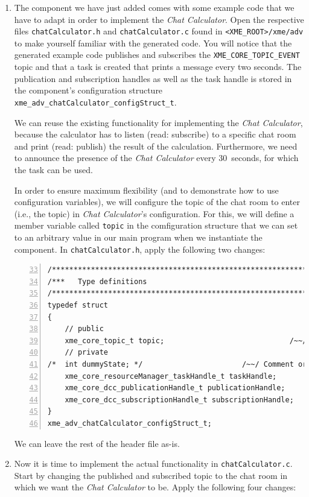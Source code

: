 \begin{enumerate}
	\item The component we have just added comes with some example code that we have to adapt in order to implement the \emph{Chat Calculator}.
		Open the respective files \verb|chatCalculator.h| and \verb|chatCalculator.c| found in \verb|<XME_ROOT>/xme/adv| to make yourself familiar with the generated code.
		You will notice that the generated example code publishes and subscribes the \verb|XME_CORE_TOPIC_EVENT| topic
		and that a task is created that prints a message every two seconds.
		The publication and subscription handles as well as the task handle is stored in the component's configuration structure \verb|xme_adv_chatCalculator_configStruct_t|.
		
		We can reuse the existing functionality for implementing the \emph{Chat Calculator},
		because the calculator has to listen (read: subscribe) to a specific chat room
		and print (read: publish) the result of the calculation.
		Furthermore, we need to announce the presence of the \emph{Chat Calculator} every 30~seconds,
		for which the task can be used.
		
		In order to ensure maximum flexibility (and to demonstrate how to use configuration variables),
		we will configure the topic of the chat room to enter (i.e., the topic) in \emph{Chat Calculator}'s configuration.
		For this, we will define a member variable called \verb|topic| in the comfiguration structure
		that we can set to an arbitrary value in our main program when we instantiate the component.
		In \verb|chatCalculator.h|, apply the following two changes:

\begin{lstlisting}[numbers=left,firstnumber=33]
/*************************************************************************/
/***   Type definitions                                                ***/
/*************************************************************************/
typedef struct
{
	// public
	xme_core_topic_t topic;                             /~~/ Change this line
	// private
/*	int dummyState; */                       /~~/ Comment or remove this line
	xme_core_resourceManager_taskHandle_t taskHandle;
	xme_core_dcc_publicationHandle_t publicationHandle;
	xme_core_dcc_subscriptionHandle_t subscriptionHandle;
}
xme_adv_chatCalculator_configStruct_t;
\end{lstlisting}

		We can leave the rest of the header file as-is.

	\item Now it is time to implement the actual functionality in \verb|chatCalculator.c|.
		Start by changing the published and subscribed topic to the chat room in which we want the \emph{Chat Calculator} to be.
		Apply the following four changes:


\end{enumerate}
